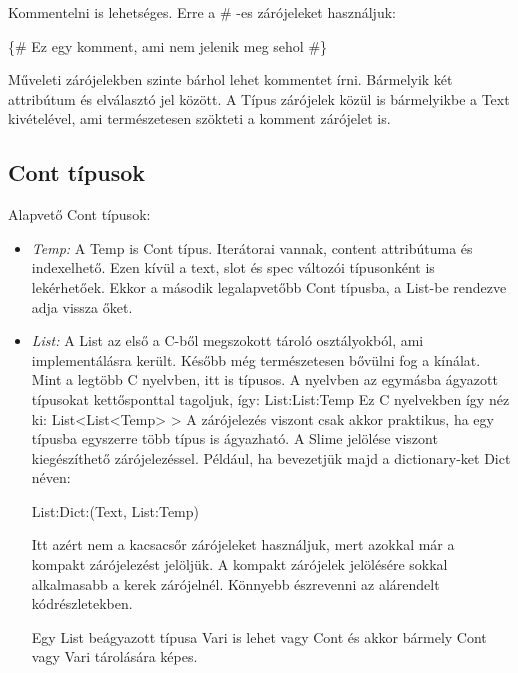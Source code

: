 Kommentelni is lehetséges. Erre a \# -es zárójeleket használjuk:

\{\# Ez egy komment, ami nem jelenik meg sehol \#\}

Műveleti zárójelekben szinte bárhol lehet kommentet írni.
Bármelyik két attribútum és elválasztó jel között.
A Típus zárójelek közül is bármelyikbe a Text kivételével, ami természetesen szökteti a komment zárójelet is.

\subsection{Cont típusok}

Alapvető Cont típusok:
\begin{itemize}
\item \emph{Temp:} 
A Temp is Cont típus. 
Iterátorai vannak, content attribútuma és indexelhető.
Ezen kívül a text, slot és spec változói típusonként is lekérhetőek.
Ekkor a második legalapvetőbb Cont típusba, a List-be rendezve adja vissza őket.
\item \emph{List:} 
A List az első a C-ből megszokott tároló osztályokból, ami implementálásra került.
Később még természetesen bővülni fog a kínálat.
Mint a legtöbb C nyelvben, itt is típusos.
A nyelvben az egymásba ágyazott típusokat kettősponttal tagoljuk, így: List:List:Temp
Ez C nyelvekben így néz ki: List<List<Temp> > 
A zárójelezés viszont csak akkor praktikus, ha egy típusba egyszerre több típus is ágyazható. 
A Slime jelölése viszont kiegészíthető zárójelezéssel. 
Például, ha bevezetjük majd a dictionary-ket Dict néven:

List:Dict:(Text, List:Temp)

Itt azért nem a kacsacsőr zárójeleket használjuk, mert azokkal már a kompakt zárójelezést jelöljük.
A kompakt zárójelek jelölésére sokkal alkalmasabb a kerek zárójelnél.
Könnyebb észrevenni az alárendelt kódrészletekben.

Egy List beágyazott típusa Vari is lehet vagy Cont és akkor bármely Cont vagy Vari tárolására képes.


\end{itemize}
